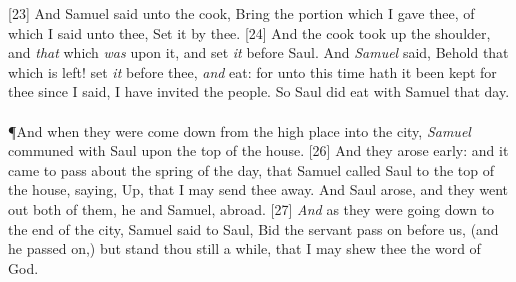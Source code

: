 [23] \textcolor[cmyk]{0.99998,1,0,0}{And Samuel said unto the cook, Bring the portion which I gave thee, of which I said unto thee, Set it by thee.}
[24] \textcolor[cmyk]{0.99998,1,0,0}{And the cook took up the shoulder, and \emph{that} which \emph{was} upon it, and set \emph{it} before Saul. And \emph{Samuel} said, Behold that which is left! set \emph{it} before thee, \emph{and} eat: for unto this time hath it been kept for thee since I said, I have invited the people. So Saul did eat with Samuel that day.}\\
\\
\P \textcolor[cmyk]{0.99998,1,0,0}{And when they were come down from the high place into the city, \emph{Samuel} communed with Saul upon the top of the house.}
[26] \textcolor[cmyk]{0.99998,1,0,0}{And they arose early: and it came to pass about the spring of the day, that Samuel called Saul to the top of the house, saying, Up, that I may send thee away. And Saul arose, and they went out both of them, he and Samuel, abroad.}
[27] \textcolor[cmyk]{0.99998,1,0,0}{\emph{And} as they were going down to the end of the city, Samuel said to Saul, Bid the servant pass on before us, (and he passed on,) but stand thou still a while, that I may shew thee the word of God.}